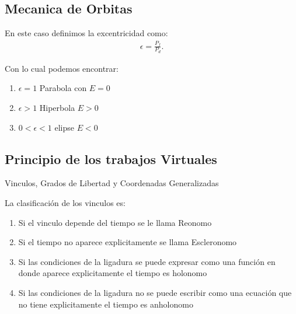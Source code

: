 \documentclass{report}
\begin{document}
      \subsection{Mecanica de Orbitas}
      En este caso definimos la excentricidad como:
      \begin{align*}
        \epsilon = \frac{P_{f}}{P_{d}}
      .\end{align*}

      Con lo cual podemos encontrar:
      \begin{enumerate}
        \item $\epsilon = 1$ Parabola con $E=0$
	\item  $\epsilon > 1$ Hiperbola $E>0$
	\item $0<\epsilon<1$ elipse $E<0$
      \end{enumerate}

      \subsection{Principio de los trabajos Virtuales}

      Vinculos, Grados de Libertad y Coordenadas Generalizadas





      La clasificación de los vinculos es:
      \begin{enumerate}
        \item Si el vinculo depende del tiempo se le llama Reonomo
	\item Si el tiempo no aparece explicitamente se llama Escleronomo
	\item Si las condiciones de la ligadura se puede expresar como una función en donde aparece explicitamente el tiempo es holonomo
	\item Si las condiciones de la ligadura no se puede escribir como una ecuación que no tiene explicitamente el tiempo es anholonomo
      \end{enumerate}
\end{document}
